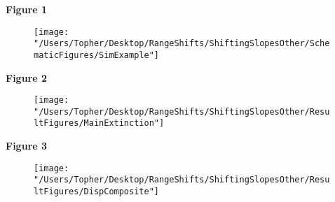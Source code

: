 \documentclass[12pt, oneside]{article}
\begin{document}
\newpage

\large{\textbf{Figure 1}}
\begin{figure}
\centering
\texttt{[image: "/Users/Topher/Desktop/RangeShifts/ShiftingSlopesOther/SchematicFigures/SimExample"]}
\vspace{-5mm}
\label{fig:SimExample}
\end{figure}

\clearpage

\large{\textbf{Figure 2}}
\begin{figure}
\centering
\texttt{[image: "/Users/Topher/Desktop/RangeShifts/ShiftingSlopesOther/ResultFigures/MainExtinction"]}
\vspace{-5mm}
\label{fig:ExtProb}
\end{figure}

\clearpage

\large{\textbf{Figure 3}}
\begin{figure}
\centering
\texttt{[image: "/Users/Topher/Desktop/RangeShifts/ShiftingSlopesOther/ResultFigures/DispComposite"]}
\vspace{-5mm}
\label{fig:Disp}
\end{figure}
\end{document}

